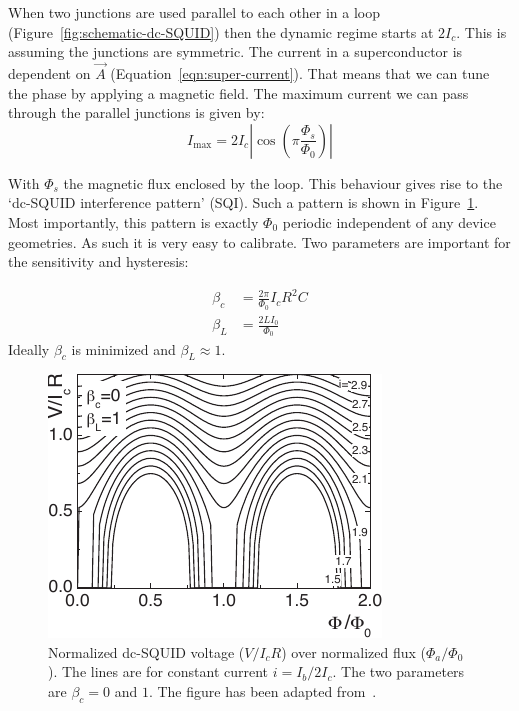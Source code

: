 When two junctions are used parallel to each other in a loop (Figure~\ref{fig:schematic-dc-SQUID}) then the dynamic regime starts at $2I_c$. This is assuming the junctions are symmetric. The current in a superconductor is dependent on $\vec{A}$ (Equation~\ref{eqn:super-current}). That means that we can tune the phase by applying a magnetic field. The maximum current we can pass through the parallel junctions is given by\cite{tinkhamIntroductionSuperconductivity,clarkeSQUIDHandbook2004}:
\begin{equation}
	I_{\text{max}} = 2I_c \left| \cos\left(\pi \frac{\Phi_s}{\Phi_0}\right) \right|
\end{equation}

With $\Phi_s$ the magnetic flux enclosed by the loop. This behaviour gives rise to the `dc-SQUID interference pattern' (SQI). Such a pattern is shown in Figure~\ref{fig:example-SQI}. Most importantly, this pattern is exactly $\Phi_0$ periodic independent of any device geometries. As such it is very easy to calibrate. Two parameters are important for the sensitivity and hysteresis\cite{clarkeSQUIDHandbook2004}:

\begin{align}
	\beta_c &= \frac{2\pi}{\Phi_0}I_cR^2C
	\tag{Stewart-McCumber parameter} \\
	\beta_L &= \frac{2LI_0}{\Phi_0}
	\tag{screening parameter}
\end{align}
Ideally $\beta_c$ is minimized and $\beta_L \approx 1$.\cite{rogSQUIDontipMagneticMicroscopy2022}

\begin{figure}[ht!]
	\centering
	\includegraphics{figures/example_SQI.pdf}
	\caption{Normalized dc-SQUID voltage ($V/I_cR$) over normalized flux ($\Phi_a/\Phi_0$). The lines are for constant current $i=I_b/2I_c$. The two parameters are $\beta_c = 0$ and $1$. The figure has been adapted from~\cite{clarkeSQUIDHandbook2004}.}
	\label{fig:example-SQI}
\end{figure}

